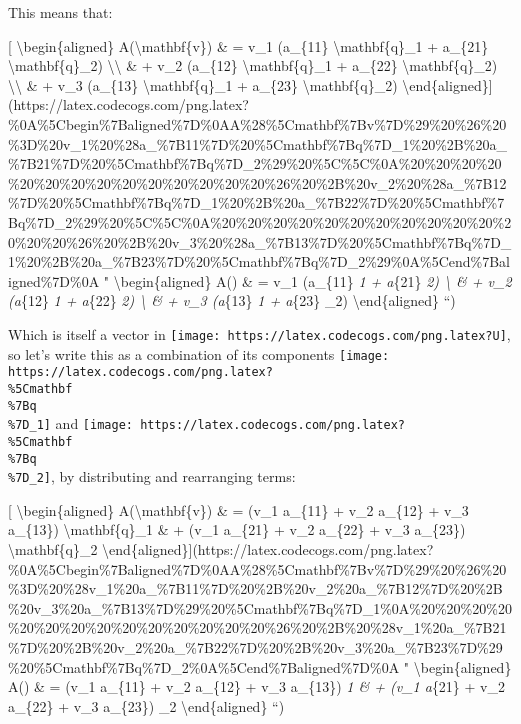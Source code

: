 \documentclass[]{article}
\begin{document}
This means that:

{[} \textbackslash{}begin\{aligned\} A(\textbackslash{}mathbf\{v\}) \& = v\_1
(a\_\{11\} \textbackslash{}mathbf\{q\}\_1 + a\_\{21\}
\textbackslash{}mathbf\{q\}\_2) \textbackslash{}\textbackslash{} \& + v\_2
(a\_\{12\} \textbackslash{}mathbf\{q\}\_1 + a\_\{22\}
\textbackslash{}mathbf\{q\}\_2) \textbackslash{}\textbackslash{} \& + v\_3
(a\_\{13\} \textbackslash{}mathbf\{q\}\_1 + a\_\{23\}
\textbackslash{}mathbf\{q\}\_2)
\textbackslash{}end\{aligned\}{]}(https://latex.codecogs.com/png.latex?\%0A\%5Cbegin\%7Baligned\%7D\%0AA\%28\%5Cmathbf\%7Bv\%7D\%29\%20\%26\%20\%3D\%20v\_1\%20\%28a\_\%7B11\%7D\%20\%5Cmathbf\%7Bq\%7D\_1\%20\%2B\%20a\_\%7B21\%7D\%20\%5Cmathbf\%7Bq\%7D\_2\%29\%20\%5C\%5C\%0A\%20\%20\%20\%20\%20\%20\%20\%20\%20\%20\%20\%20\%20\%20\%26\%20\%2B\%20v\_2\%20\%28a\_\%7B12\%7D\%20\%5Cmathbf\%7Bq\%7D\_1\%20\%2B\%20a\_\%7B22\%7D\%20\%5Cmathbf\%7Bq\%7D\_2\%29\%20\%5C\%5C\%0A\%20\%20\%20\%20\%20\%20\%20\%20\%20\%20\%20\%20\%20\%20\%26\%20\%2B\%20v\_3\%20\%28a\_\%7B13\%7D\%20\%5Cmathbf\%7Bq\%7D\_1\%20\%2B\%20a\_\%7B23\%7D\%20\%5Cmathbf\%7Bq\%7D\_2\%29\%0A\%5Cend\%7Baligned\%7D\%0A
" \textbackslash{}begin\{aligned\} A() \& = v\_1 (a\_\{11\}
\emph{1 + a}\{21\} \emph{2) \textbackslash{} \& + v\_2
(a}\{12\} \emph{1 + a}\{22\} \emph{2) \textbackslash{} \& +
v\_3 (a}\{13\} \emph{1 + a}\{23\} \_2)
\textbackslash{}end\{aligned\} ``)

Which is itself a vector in
\texttt{[image: https://latex.codecogs.com/png.latex?U]}, so let's write this as
a combination of its components
\texttt{[image: https://latex.codecogs.com/png.latex?\\\%5Cmathbf\\\%7Bq\\\%7D\_1]} and
\texttt{[image: https://latex.codecogs.com/png.latex?\\\%5Cmathbf\\\%7Bq\\\%7D\_2]}, by
distributing and rearranging terms:

{[} \textbackslash{}begin\{aligned\} A(\textbackslash{}mathbf\{v\}) \& = (v\_1
a\_\{11\} + v\_2 a\_\{12\} + v\_3 a\_\{13\}) \textbackslash{}mathbf\{q\}\_1 \& +
(v\_1 a\_\{21\} + v\_2 a\_\{22\} + v\_3 a\_\{23\})
\textbackslash{}mathbf\{q\}\_2
\textbackslash{}end\{aligned\}{]}(https://latex.codecogs.com/png.latex?\%0A\%5Cbegin\%7Baligned\%7D\%0AA\%28\%5Cmathbf\%7Bv\%7D\%29\%20\%26\%20\%3D\%20\%28v\_1\%20a\_\%7B11\%7D\%20\%2B\%20v\_2\%20a\_\%7B12\%7D\%20\%2B\%20v\_3\%20a\_\%7B13\%7D\%29\%20\%5Cmathbf\%7Bq\%7D\_1\%0A\%20\%20\%20\%20\%20\%20\%20\%20\%20\%20\%20\%20\%20\%20\%26\%20\%2B\%20\%28v\_1\%20a\_\%7B21\%7D\%20\%2B\%20v\_2\%20a\_\%7B22\%7D\%20\%2B\%20v\_3\%20a\_\%7B23\%7D\%29\%20\%5Cmathbf\%7Bq\%7D\_2\%0A\%5Cend\%7Baligned\%7D\%0A
" \textbackslash{}begin\{aligned\} A() \& = (v\_1 a\_\{11\} + v\_2
a\_\{12\} + v\_3 a\_\{13\}) \emph{1 \& + (v\_1 a}\{21\} + v\_2
a\_\{22\} + v\_3 a\_\{23\}) \_2 \textbackslash{}end\{aligned\} ``)
\end{document}
